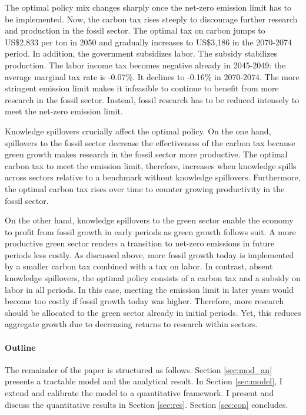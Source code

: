 The optimal policy mix changes sharply once the net-zero emission limit has to be implemented. Now, the carbon tax rises steeply to discourage further research and production in the fossil sector. The optimal tax on carbon jumps to US\$2,833 per ton in 2050 and gradually increases to US\$3,186 in the 2070-2074 period. In addition, the government subsidizes labor. The subsidy stabilizes production. The labor income tax becomes negative already in 2045-2049: the average marginal tax rate is -0.07\%. It declines to -0.16\% in 2070-2074. The more stringent emission limit makes it infeasible to continue to benefit from more research in the fossil sector. Instead, fossil research has to be reduced intensely to meet the net-zero emission limit.

Knowledge spillovers crucially affect the optimal policy. On the one hand, spillovers to the fossil sector decrease the effectiveness of the carbon tax because green growth makes research in the fossil sector more productive. The optimal carbon tax to meet the emission limit, therefore, increases when knowledge spills across sectors relative to a benchmark without knowledge spillovers. Furthermore, the optimal carbon tax rises over time to counter growing productivity in the fossil sector. 

On the other hand, knowledge spillovers to the green sector enable the economy to profit from fossil growth in early periods as green growth follows suit. A more productive green sector renders a transition to net-zero emissions in future periods less costly. As discussed above, more fossil growth today is implemented by a smaller carbon tax combined with a tax on labor. In contrast, absent knowledge spillovers, the optimal policy consists of a carbon tax and a subsidy on labor in all periods. In this case, meeting the emission limit in later years would become too costly if fossil growth today was higher. Therefore, more research should be allocated to the green sector already in initial periods. Yet, this reduces aggregate growth due to decreasing returns to research within sectors. 



\paragraph{Outline}
The remainder of the paper is structured as follows. Section \ref{sec:mod_an} presents a tractable model and the analytical result. In Section \ref{sec:model}, I extend and calibrate the model to a quantitative framework. I present and discuss the quantitative results in Section \ref{sec:res}. Section \ref{sec:con} concludes.